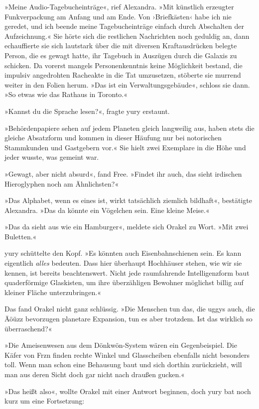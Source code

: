 »Meine Audio-Tagebucheinträge«, rief Alexandra. »Mit künstlich erzeugter Funkverpackung am Anfang und am Ende. Von ›Briefkästen‹ habe ich nie geredet, und ich beende meine Tagebucheinträge einfach durch Abschalten der Aufzeichnung.« Sie hörte sich die restlichen Nachrichten noch geduldig an, dann echauffierte sie sich lautstark über die mit diversen Kraftausdrücken belegte Person, die es gewagt hatte, ihr Tagebuch in Auszügen durch die Galaxis zu schicken. Da vorerst mangels Personenkenntnis keine Möglichkeit bestand, die impulsiv angedrohten Racheakte in die Tat umzusetzen, stöberte sie murrend weiter in den Folien herum. »Das ist ein Verwaltungsgebäude«, schloss sie dann. »So etwas wie das Rathaus in Toronto.«

»Kannst du die Sprache lesen?«, fragte yury erstaunt.

»Behördenpapiere sehen auf jedem Planeten gleich langweilig aus, haben stets die gleiche Absatzform und kommen in dieser Häufung nur bei notorischen Stammkunden und Gastgebern vor.« Sie hielt zwei Exemplare in die Höhe und jeder wusste, was gemeint war.

»Gewagt, aber nicht absurd«, fand Free. »Findet ihr auch, das sieht irdischen Hieroglyphen noch am Ähnlichsten?«

»Das Alphabet, wenn es eines ist, wirkt tatsächlich ziemlich bildhaft«, bestätigte Alexandra. »Das da könnte ein Vögelchen sein. Eine kleine Meise.«

»Das da sieht aus wie ein Hamburger«, meldete sich Orakel zu Wort. »Mit zwei Buletten.«

yury schüttelte den Kopf. »Es könnten auch Eisenbahnschienen sein. Es kann eigentlich \emph{alles} bedeuten. Dass hier überhaupt Hochhäuser stehen, wie wir sie kennen, ist bereits beachtenswert. Nicht jede raumfahrende Intelligenzform baut quaderförmige Glaskisten, um ihre überzähligen Bewohner möglichst billig auf kleiner Fläche unterzubringen.«

Das fand Orakel nicht ganz schlüssig. »Die Menschen tun das, die uggys auch, die Äöüzz bevorzugen planetare Expansion, tun es aber trotzdem. Ist das wirklich so überraschend?«

»Die Ameisenwesen aus dem Dönkwön-System wären ein Gegenbeispiel. Die Käfer von Frzn finden rechte Winkel und Glasscheiben ebenfalls nicht besonders toll. Wenn man schon eine Behausung baut und sich dorthin zurückzieht, will man aus deren Sicht doch gar nicht nach draußen gucken.«

»Das heißt also«, wollte Orakel mit einer Antwort beginnen, doch yury bat noch kurz um eine Fortsetzung:

